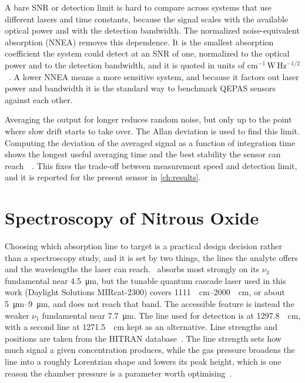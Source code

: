 A bare SNR or detection limit is hard to compare across systems that use different lasers and time constants, because the signal scales with the available optical power and with the detection bandwidth. The normalized noise-equivalent absorption (NNEA) removes this dependence. It is the smallest absorption coefficient the system could detect at an SNR of one, normalized to the optical power and to the detection bandwidth, and it is quoted in units of $\mathrm{cm^{-1}\,W\,Hz^{-1/2}}$~\cite{patimisco2014}. A lower NNEA means a more sensitive system, and because it factors out laser power and bandwidth it is the standard way to benchmark QEPAS sensors against each other.

Averaging the output for longer reduces random noise, but only up to the point where slow drift starts to take over. The Allan deviation is used to find this limit. Computing the deviation of the averaged signal as a function of integration time shows the longest useful averaging time and the best stability the sensor can reach~\cite{ma2013}~. This fixes the trade-off between measurement speed and detection limit, and it is reported for the present sensor in \cref{ch:results}.

\section{Spectroscopy of Nitrous Oxide}
\label{sec:n2o-spectroscopy}

Choosing which absorption line to target is a practical design decision rather than a spectroscopy study, and it is set by two things, the lines the analyte offers and the wavelengths the laser can reach. \nto\ absorbs most strongly on its $\nu_3$ fundamental near \SI{4.5}{\micro\meter}, but the tunable quantum cascade laser used in this work (Daylight Solutions MIRcat-2300) covers \SIrange{1111}{2000}{\per\centi\meter}, or about \SIrange{5}{9}{\micro\meter}, and does not reach that band. The accessible feature is instead the weaker $\nu_1$ fundamental near \SI{7.7}{\micro\meter}. The line used for detection is at \SI{1297.8}{\per\centi\meter}, with a second line at \SI{1271.5}{\per\centi\meter} kept as an alternative. Line strengths and positions are taken from the HITRAN database~. The line strength sets how much signal a given concentration produces, while the gas pressure broadens the line into a roughly Lorentzian shape and lowers its peak height, which is one reason the chamber pressure is a parameter worth optimising~.

